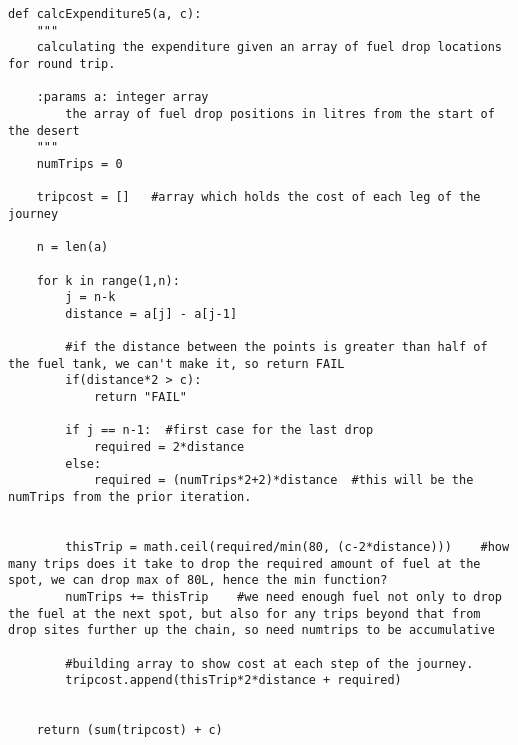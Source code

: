 \documentclass{homework}
\begin{document}
\begin{lstlisting}
def calcExpenditure5(a, c):
    """
    calculating the expenditure given an array of fuel drop locations for round trip.

    :params a: integer array
        the array of fuel drop positions in litres from the start of the desert
    """
    numTrips = 0

    tripcost = []   #array which holds the cost of each leg of the journey

    n = len(a)  

    for k in range(1,n):   
        j = n-k 
        distance = a[j] - a[j-1]

        #if the distance between the points is greater than half of the fuel tank, we can't make it, so return FAIL
        if(distance*2 > c):
            return "FAIL"

        if j == n-1:  #first case for the last drop
            required = 2*distance
        else:
            required = (numTrips*2+2)*distance  #this will be the numTrips from the prior iteration.

        
        thisTrip = math.ceil(required/min(80, (c-2*distance)))    #how many trips does it take to drop the required amount of fuel at the spot, we can drop max of 80L, hence the min function?
        numTrips += thisTrip    #we need enough fuel not only to drop the fuel at the next spot, but also for any trips beyond that from drop sites further up the chain, so need numtrips to be accumulative
        
        #building array to show cost at each step of the journey.
        tripcost.append(thisTrip*2*distance + required)


    return (sum(tripcost) + c)

\end{lstlisting}
\newline
\end{document}
